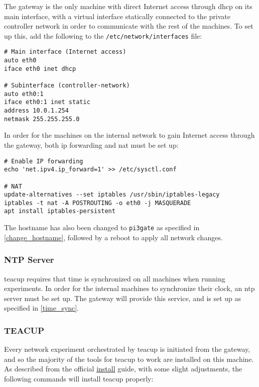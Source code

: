 The gateway is the only machine with direct Internet access through \gls{dhcp} on its main interface, with a virtual interface statically connected to the private controller network in order to communicate with the rest of the machines. To set up this, add the following to the \lstinline{/etc/network/interfaces} file:

\begin{verbatim}
# Main interface (Internet access)
auto eth0
iface eth0 inet dhcp

# Subinterface (controller-network)
auto eth0:1
iface eth0:1 inet static
address 10.0.1.254
netmask 255.255.255.0
\end{verbatim}

In order for the machines on the internal network to gain Internet access through the gateway, both \gls{ip} forwarding and \gls{nat} must be set up:

\begin{verbatim}
# Enable IP forwarding
echo 'net.ipv4.ip_forward=1' >> /etc/sysctl.conf

# NAT
update-alternatives --set iptables /usr/sbin/iptables-legacy
iptables -t nat -A POSTROUTING -o eth0 -j MASQUERADE
apt install iptables-persistent
\end{verbatim}

The hostname has also been changed to \lstinline{pi3gate} as specified in \ref{change_hostname}, followed by a reboot to apply all network changes.


\subsubsection{NTP Server}

\gls{teacup} requires that time is synchronized on all machines when running experiments. In order for the internal machines to synchronize their clock, an \gls{ntp} server must be set up. The gateway will provide this service, and is set up as specified in \ref{time_sync}.


\subsubsection{TEACUP} \label{teacup_gateway}

Every network experiment orchestrated by \gls{teacup} is initiated from the gateway, and so the majority of the tools for \gls{teacup} to work are installed on this machine. As described from the official \href{http://caia.swin.edu.au/tools/teacup/TEACUP-0.9_INSTALL.txt}{install} guide, with some slight adjustments, the following commands will install \gls{teacup} properly:

